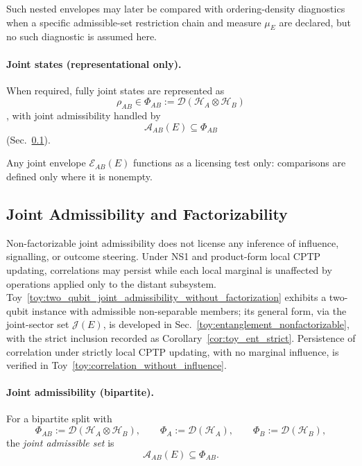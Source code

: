 \documentclass[aps,prx,onecolumn,11pt]{revtex4-2}
\theoremstyle{plain}
\theoremstyle{definition}
\theoremstyle{remark}
\begin{document}
Such nested envelopes may later be compared with ordering-density
diagnostics when a specific admissible-set restriction chain and
measure \(\mu_E\) are declared, but no such diagnostic is assumed here.

\paragraph{Joint states (representational only).}

When required, fully joint states are represented as
\[
\rho_{AB}\in
\Phi_{AB}
:=
\mathcal{D}(\mathcal{H}_A\otimes\mathcal{H}_B)
\]
\cite{NielsenChuang2010,Watrous2018}, with joint admissibility handled
by
\[
\mathcal{A}_{AB}(E)\subseteq\Phi_{AB}
\]
(Sec.~\ref{subsec:core_joint_admissibility}).

Any joint envelope \(\mathcal{E}_{AB}(E)\) functions as a licensing
test only: comparisons are defined only where it is nonempty.

\subsection{Joint Admissibility and Factorizability}
\label{subsec:core_joint_admissibility}

Non-factorizable joint admissibility does not license any inference of
influence, signalling, or outcome steering. Under NS1 and product-form
local CPTP updating, correlations may persist while each local marginal
is unaffected by operations applied only to the distant subsystem.
Toy~\ref{toy:two_qubit_joint_admissibility_without_factorization}
exhibits a two-qubit instance with admissible non-separable members;
its general form, via the joint-sector set \(\mathcal J(E)\), is
developed in Sec.~\ref{toy:entanglement_nonfactorizable}, with the
strict inclusion recorded as Corollary~\ref{cor:toy_ent_strict}. Persistence
of correlation under strictly local
CPTP updating, with no marginal influence, is verified in
Toy~\ref{toy:correlation_without_influence}.

\paragraph{Joint admissibility (bipartite).}

For a bipartite split with
\[
\Phi_{AB}:=\mathcal{D}(\mathcal{H}_A\otimes\mathcal{H}_B),
\qquad
\Phi_A:=\mathcal{D}(\mathcal{H}_A),
\qquad
\Phi_B:=\mathcal{D}(\mathcal{H}_B),
\]
the \emph{joint admissible set} is
\begin{equation}
\mathcal{A}_{AB}(E)\subseteq\Phi_{AB}.
\label{eq:joint_admissible_set_def_core}
\end{equation}
\end{document}
